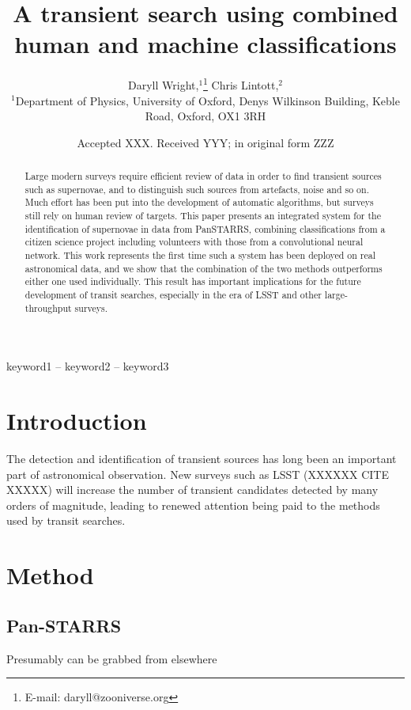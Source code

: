 \documentclass[a4paper,fleqn,usenatbib]{mnras}
\title[Human and machine classifications]{A transient search using combined human and machine classifications}
\author[D. Wright, C. Lintott et al.]{
Daryll Wright,$^{1}$\thanks{E-mail: daryll@zooniverse.org}
Chris Lintott,$^{2}$

$^{1}$Department of Physics, University of Oxford, Denys Wilkinson Building, Keble Road, Oxford, OX1 3RH
}
\date{Accepted XXX. Received YYY; in original form ZZZ}
\begin{document}
\label{firstpage}
\pagerange{\pageref{firstpage}--\pageref{lastpage}}
\maketitle

\begin{abstract}
Large modern surveys require efficient review of data in order to find transient sources such as supernovae, and to distinguish such sources from artefacts, noise and so on. Much effort has been put into the development of automatic algorithms, but surveys still rely on human review of targets. This paper presents an integrated system for the identification of supernovae in data from PanSTARRS, combining classifications from a citizen science project including volunteers with those from a convolutional neural network. This work represents the first time such a system has been deployed on real astronomical data, and we show that the combination of the two methods outperforms either one used individually. This result has important implications for the future development of transit searches, especially in the era of LSST and other large-throughput surveys. 
\end{abstract}

\begin{keywords}
keyword1 -- keyword2 -- keyword3
\end{keywords}



\section{Introduction}

The detection and identification of transient sources has long been an important part of astronomical observation. New surveys such as LSST (XXXXXX CITE XXXXX) will increase the number of transient candidates detected by many orders of magnitude, leading to renewed attention being paid to the methods used by transit searches. 

\section{Method}
\subsection{Pan-STARRS}
Presumably can be grabbed from elsewhere
\end{document}
